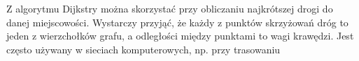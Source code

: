 \documentclass[preview]{standalone}
\begin{document}
\begin{center}
Z algorytmu Dijkstry można skorzystać przy obliczaniu najkrótszej drogi do danej miejscowości. Wystarczy przyjąć, że każdy z punktów skrzyżowań dróg to jeden z wierzchołków grafu, a odległości między punktami to wagi krawędzi. Jest często używany w sieciach komputerowych, np. przy trasowaniu
\end{center}
\end{document}
